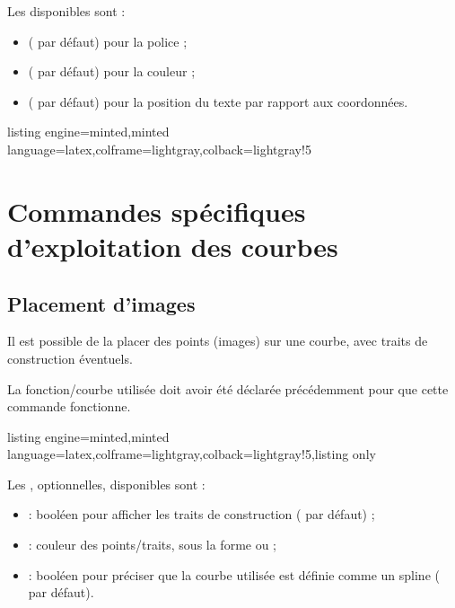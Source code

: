 \documentclass[11pt,a4paper]{ltxdoc}
\begin{document}
Les \MontreCode{[clés]} disponibles sont :

\begin{itemize}
	\item {} ( par défaut) pour la police ;
	\item {} ( par défaut) pour la couleur ;
	\item {} ( par défaut) pour la position du texte par rapport aux coordonnées.
\end{itemize}

\begin{tcblisting}{listing engine=minted,minted language=latex,colframe=lightgray,colback=lightgray!5}
	\begin{GraphiqueTikz}[x=1cm,y=1cm,Xmin=0,Xmax=5,Ymin=0,Ymax=1]
	\end{GraphiqueTikz}
\end{tcblisting}

\pagebreak

\section{Commandes spécifiques d'exploitation des courbes}

\subsection{Placement d'images}\label{images}

Il est possible de la placer des points (images) sur une courbe, avec traits de construction éventuels.

La fonction/courbe utilisée doit avoir été déclarée précédemment pour que cette commande fonctionne.

\begin{tcblisting}{listing engine=minted,minted language=latex,colframe=lightgray,colback=lightgray!5,listing only}
\end{tcblisting}

Les \MontreCode{[clés]}, optionnelles, disponibles sont :

\smallskip

\begin{itemize}
	\item {} : booléen pour afficher les traits de construction ( par défaut) ;
	\item {} : couleur des points/traits, sous la forme  ou  ;
	\item {} : booléen pour préciser que la courbe utilisée est définie comme un \textsf{spline} ( par défaut).
\end{itemize}
\end{document}
